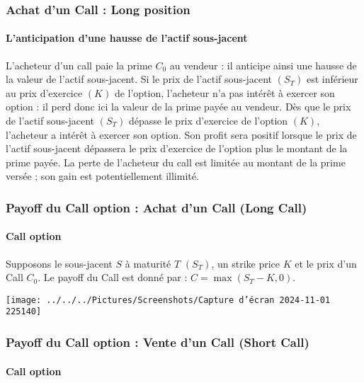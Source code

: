 \documentclass[a4paper, 12pt]{report}
\begin{document}
\subsubsection{Achat d’un Call : Long position}

\paragraph{L’anticipation d’une hausse de l’actif sous-jacent}

L’acheteur d’un call paie la prime \( C_0 \) au vendeur : il anticipe ainsi une hausse de la valeur de l’actif sous-jacent. Si le prix de l’actif sous-jacent \( (S_T) \) est inférieur au prix d’exercice \( (K) \) de l’option, l’acheteur n’a pas intérêt à exercer son option : il perd donc ici la valeur de la prime payée au vendeur. Dès que le prix de l’actif sous-jacent \( (S_T) \) dépasse le prix d’exercice de l’option \( (K) \), l’acheteur a intérêt à exercer son option. Son profit sera positif lorsque le prix de l’actif sous-jacent dépassera le prix d’exercice de l’option plus le montant de la prime payée. La perte de l’acheteur du call est limitée au montant de la prime versée ; son gain est potentiellement illimité.

\subsubsection{Payoff du Call option : Achat d’un Call (Long Call)}

\paragraph{Call option}

Supposons le sous-jacent \( S \) à maturité \( T \) \( (S_T) \), un strike price \( K \) et le prix d’un Call \( C_0 \). Le payoff du Call est donné par : \( C = \max(S_T - K, 0) \).

\texttt{[image: ../../../Pictures/Screenshots/Capture d'écran 2024-11-01 225140]}

\subsubsection{Payoff du Call option : Vente d’un Call (Short Call)}

\paragraph{Call option}
\end{document}
